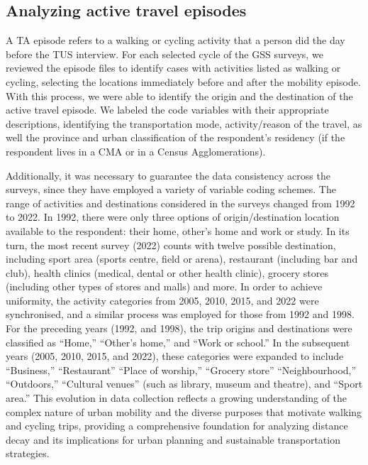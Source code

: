 \documentclass[preprint, 3p,
authoryear]{elsarticle} %
\begin{document}
\subsection{Analyzing active travel
episodes}\label{analyzing-active-travel-episodes}

A TA episode refers to a walking or cycling activity that a person did
the day before the TUS interview. For each selected cycle of the GSS
surveys, we reviewed the episode files to identify cases with activities
listed as walking or cycling, selecting the locations immediately before
and after the mobility episode. With this process, we were able to
identify the origin and the destination of the active travel episode. We
labeled the code variables with their appropriate descriptions,
identifying the transportation mode, activity/reason of the travel, as
well the province and urban classification of the respondent's residency
(if the respondent lives in a CMA or in a Census Agglomerations).

Additionally, it was necessary to guarantee the data consistency across
the surveys, since they have employed a variety of variable coding
schemes. The range of activities and destinations considered in the
surveys changed from 1992 to 2022. In 1992, there were only three
options of origin/destination location available to the respondent:
their home, other's home and work or study. In its turn, the most recent
survey (2022) counts with twelve possible destination, including sport
area (sports centre, field or arena), restaurant (including bar and
club), health clinics (medical, dental or other health clinic), grocery
stores (including other types of stores and malls) and more. In order to
achieve uniformity, the activity categories from 2005, 2010, 2015, and
2022 were synchronised, and a similar process was employed for those
from 1992 and 1998. For the preceding years (1992, and 1998), the trip
origins and destinations were classified as ``Home,'' ``Other's home,''
and ``Work or school.'' In the subsequent years (2005, 2010, 2015, and
2022), these categories were expanded to include ``Business,''
``Restaurant'' ``Place of worship,'' ``Grocery store''
``Neighbourhood,'' ``Outdoors,'' ``Cultural venues'' (such as library,
museum and theatre), and ``Sport area.'' This evolution in data
collection reflects a growing understanding of the complex nature of
urban mobility and the diverse purposes that motivate walking and
cycling trips, providing a comprehensive foundation for analyzing
distance decay and its implications for urban planning and sustainable
transportation strategies.
\end{document}
